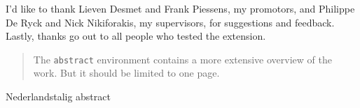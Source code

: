 \documentclass[master=cws,english]{kulemt}
\begin{document}
\begin{preface}
I'd like to thank Lieven Desmet and Frank Piessens, my promotors, and Philippe De Ryck and Nick Nikiforakis, my supervisors, for suggestions and feedback. Lastly, thanks go out to all people who tested the extension.
\end{preface}

\tableofcontents*

\begin{abstract}
The \texttt{abstract} environment contains a more extensive overview of
the work. But it should be limited to one page.
\end{abstract}

\begin{abstract*}
Nederlandstalig abstract
\end{abstract*}

\listoffiguresandtables

\printglossaries

\mainmatter







\backmatter

\end{document}
